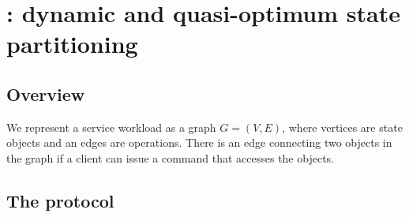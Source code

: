 \section{\dynastar: dynamic and quasi-optimum state partitioning}


\subsection{Overview}

We represent a service workload as a graph $G = (V, E)$, where vertices are state objects and an edges are operations.
There is an edge connecting two objects in the graph if a client can issue a command that accesses the objects. 




\subsection{The \dynastar protocol}



